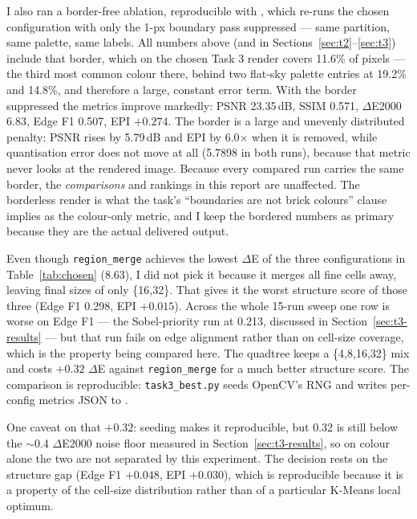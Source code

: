 \documentclass[11pt,a4paper]{article}
\begin{document}
I also ran a border-free ablation, reproducible with , which re-runs the chosen configuration with
only the 1-px boundary pass suppressed --- same partition, same palette, same
labels. All numbers above (and in Sections~\ref{sec:t2}--\ref{sec:t3}) include
that border, which on the chosen Task 3 render covers 11.6\% of pixels --- the
third most common colour there, behind two flat-sky palette entries at 19.2\%
and 14.8\%, and therefore a large, constant error term. With the border
suppressed the metrics improve markedly: PSNR 23.35\,dB, SSIM 0.571, $\Delta$E2000
6.83, Edge F1 0.507, EPI $+0.274$. The border is a large and unevenly
distributed penalty: PSNR rises by 5.79\,dB and EPI by 6.0$\times$ when it is
removed, while quantisation error does not move at all (5.7898 in both runs),
because that metric never looks at the rendered image. Because every compared run
carries the same border, the \emph{comparisons} and rankings in this report are
unaffected. The borderless render is what the task's ``boundaries are not brick
colours'' clause implies as the colour-only metric, and I keep the bordered
numbers as primary because they are the actual delivered output.

Even though \texttt{region\_merge} achieves the lowest $\Delta$E of the three
configurations in Table~\ref{tab:chosen} (8.63), I did not pick it because it
merges all fine cells away, leaving final sizes of only \{16,32\}. That gives it
the worst structure score of those three (Edge F1 0.298, EPI $+0.015$). Across
the whole 15-run sweep one row is worse on Edge F1 --- the Sobel-priority run at
0.213, discussed in Section~\ref{sec:t3-results} --- but that run fails on edge
alignment rather than on cell-size coverage, which is the property being compared
here. The quadtree keeps a \{4,8,16,32\} mix and costs $+0.32$ $\Delta$E against
\texttt{region\_merge} for a much better structure score. The comparison is
reproducible: \texttt{task3\_best.py} seeds OpenCV's RNG and writes per-config
metrics JSON to .

One caveat on that $+0.32$: seeding makes it reproducible, but 0.32 is still
below the $\sim$0.4 $\Delta$E2000 noise floor measured in
Section~\ref{sec:t3-results}, so on colour alone the two are not separated by this
experiment. The decision rests on the structure gap (Edge F1 $+0.048$, EPI
$+0.030$), which is reproducible because it is a property of the cell-size
distribution rather than of a particular K-Means local optimum.
\end{document}
